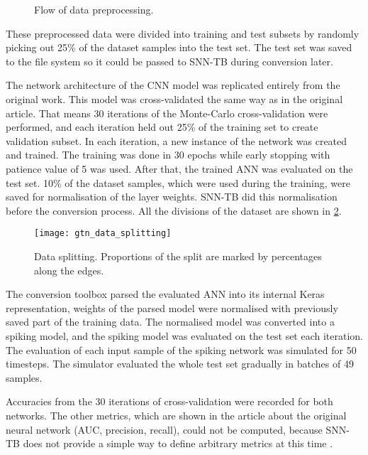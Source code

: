 \begin{figure}[htb]
    \centering
    
    \caption{Flow of data preprocessing.}
    \label{fig:gtn_preprocessing}
\end{figure}

These preprocessed data were divided into training and test subsets by randomly picking out 25\% of the dataset samples into the test set. The test set was saved to the file system so it could be passed to SNN-TB during conversion later. \par
The network architecture of the CNN model was replicated entirely from the original work. This model was cross-validated the same way as in the original article. That means 30 iterations of the Monte-Carlo cross-validation were performed, and each iteration held out 25\% of the training set to create validation subset. In each iteration, a new instance of the network was created and trained. The training was done in 30 epochs while early stopping with patience value of 5 was used. After that, the trained ANN was evaluated on the test set. 10\% of the dataset samples, which were used during the training, were saved for normalisation of the layer weights. SNN-TB did this normalisation before the conversion process. All the divisions of the dataset are shown in \cref{fig:gtn_data_spliting}.

\begin{figure}[htbp]
    \centering
    \texttt{[image: gtn\_data\_splitting]}
    \caption{Data splitting. Proportions of the split are marked by percentages along the edges.}
    \label{fig:gtn_data_spliting}
\end{figure}

The conversion toolbox parsed the evaluated ANN into its internal Keras representation, weights of the parsed model were normalised with previously saved part of the training data. The normalised model was converted into a spiking model, and the spiking model was evaluated on the test set each iteration. The evaluation of each input sample of the spiking network was simulated for 50 timesteps. The simulator evaluated the whole test set gradually in batches of 49 samples. \par
Accuracies from the 30 iterations of cross-validation were recorded for both networks. The other metrics, which are shown in the article about the original neural network (AUC, precision, recall), could not be computed, because SNN-TB does not provide a simple way to define arbitrary metrics at this time \footnotemark.

